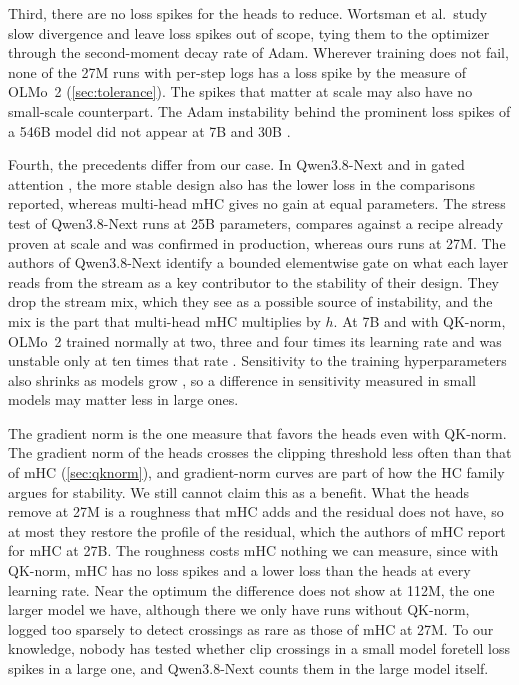 \documentclass[11pt, a4paper]{article}
\begin{document}
Third, there are no loss spikes for the heads to reduce. Wortsman et al.\ study slow divergence and leave loss spikes out of
scope, tying them to the optimizer through the second-moment decay rate of Adam. Wherever training does not fail, none of the 27M
runs with per-step logs has a loss spike by the measure of OLMo~2 (\cref{sec:tolerance}). The spikes that matter at scale may also
have no small-scale counterpart. The Adam instability behind the prominent loss spikes of a 546B model did not appear at 7B and 30B
\citep{molybog2023adam}.

Fourth, the precedents differ from our case. In Qwen3.8-Next and in gated attention \citep{qiu2025gatedattention}, the more stable
design also has the lower loss in the comparisons reported, whereas multi-head mHC gives no gain at equal parameters. The stress
test of Qwen3.8-Next runs at 25B parameters, compares against a recipe already proven at scale and was confirmed in production,
whereas ours runs at 27M. The authors of Qwen3.8-Next identify a bounded elementwise gate on what each layer reads from the
stream as a key contributor to the stability of their design. They drop the stream mix, which they see as a possible source of instability, and the mix is the part
that multi-head mHC multiplies by $h$. At 7B and with QK-norm, OLMo~2 trained normally at two, three and four times its learning
rate and was unstable only at ten times that rate \citep{olmo2024olmo2}. Sensitivity to the training hyperparameters
also shrinks as models grow \citep{lourie2026smallscale}, so a difference in sensitivity measured in small models may matter
less in large ones.

The gradient norm is the one measure that favors the heads even with QK-norm. The gradient norm of the heads crosses the clipping threshold less often
than that of mHC (\cref{sec:qknorm}), and gradient-norm curves are part of how the HC family argues for stability. We
still cannot claim this as a benefit. What the heads remove at 27M is a roughness that mHC adds and the residual does not have, so
at most they restore the profile of the residual, which the authors of mHC report for mHC at 27B. The roughness costs
mHC nothing we can measure, since with QK-norm, mHC has no loss spikes and a lower loss than the heads at every learning rate. Near
the optimum the difference does not show at 112M, the one larger model we have, although there we only have runs without QK-norm,
logged too sparsely to detect crossings as rare as those of mHC at 27M. To our knowledge, nobody has tested whether clip crossings in a
small model foretell loss spikes in a large one, and Qwen3.8-Next counts them in the large model itself.
\end{document}
